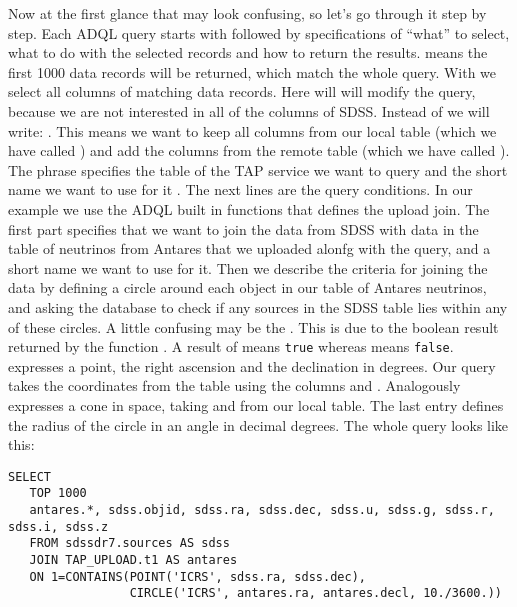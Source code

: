 \documentclass[twoside]{article}[12pt]
\begin{document}
Now at the first glance that may look confusing, so let's go through it
step by step. Each ADQL query starts with  followed by
specifications of ``what'' to select, what to do with the selected records
and how to return the results. 
means the first 1000 data records will be returned, which match the
whole query. 
With \sql{*} we select all columns of matching data records. Here will
will modify the query, because we are not interested in all of the
columns of SDSS. Instead of \sql{*} we will write: 
. This
means we want to keep all columns from our local table (which we have called
) and add the columns from the remote table (which we have called ). 
The phrase  specifies the table of the TAP service we
want to query  and the short name we want to use for it . 
The next lines are the query conditions. In our example we use the ADQL
built in functions that defines the upload join.
The first part  specifies that we want to join the data from SDSS with 
data in the table of neutrinos from Antares that we uploaded alonfg with the query,
and a short name we want to use for it.
Then we describe the criteria for joining the data by defining a
circle around each object in our table of Antares neutrinos, and asking the database to
check if any sources in the SDSS table lies within any of these
circles. 
A little confusing may be the . This is due to the boolean
result returned by the function . A result of 
means \verb|true| whereas  means \verb|false|. 
 expresses a point, the right ascension and the declination
in degrees. Our query takes the coordinates from the table using the columns
 and . 
Analogously  expresses a cone in space, taking  and
 from our local table. The last entry defines the radius of
the circle in an angle in decimal degrees. The whole query looks like
this: 

\lstset{style=daiquiri, language=SQL}
\begin{lstlisting}
SELECT
   TOP 1000
   antares.*, sdss.objid, sdss.ra, sdss.dec, sdss.u, sdss.g, sdss.r, sdss.i, sdss.z
   FROM sdssdr7.sources AS sdss
   JOIN TAP_UPLOAD.t1 AS antares
   ON 1=CONTAINS(POINT('ICRS', sdss.ra, sdss.dec),
                 CIRCLE('ICRS', antares.ra, antares.decl, 10./3600.))
\end{lstlisting}
\end{document}
